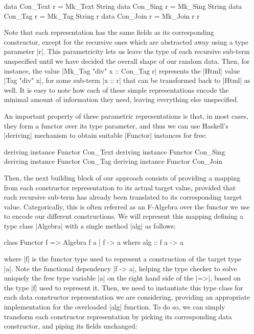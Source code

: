 \begin{code}
data Con_Text   r = Mk_Text  String
data Con_Sing   r = Mk_Sing  String
data Con_Tag    r = Mk_Tag   String r
data Con_Join   r = Mk_Join  r r
\end{code}
%
Note that each representation has the same fields as its corresponding
constructor, except for the recursive ones which are abstracted away using a
type parameter |r|.
%
This parametricity lets us leave the type of each recursive sub-term unspecified
until we have decided the overall shape of our random data.
%
Then, for instance, the value |Mk_Tag "div" x :: Con_Tag r| represents the
|Html| value |Tag "div" x|, for some sub-term |x :: r| that can be transformed
back to |Html| as well.
%
It is easy to note how each of these simple representations encode the minimal
amount of information they need, leaving everything else unspecified.

An important property of these parametric representations is that, in most
cases, they form a functor over its type parameter, and thus we can use
Haskell's |deriving| mechanism to obtain suitable |Functor| instances for free:

\begin{code}
deriving instance Functor Con_Text
deriving instance Functor Con_Sing
deriving instance Functor Con_Tag
deriving instance Functor Con_Join
\end{code}


%
Then, the next building block of our approach consists of providing a mapping
from each constructor representation to its actual target value, provided that
each recursive sub-term has already been translated to its corresponding target
value.
%
Categorically, this is often referred as an F-Algebra over the functor we use to
encode our different constructions.
%
We will represent this mapping defining a type class |Algebra| with a single
method |alg| as follows:

\begin{code}
class Functor f => Algebra f a | f -> a where
  alg :: f a -> a
\end{code}
%
where |f| is the functor type used to represent a construction of the target
type |a|.
%
Note the functional dependency |f -> a|, helping the type checker to solve
uniquely the free type variable |a| on the right hand side of the |=>|, based on
the type |f| used to represent it.
%
%
Then, we need to instantiate this type class for each data constructor
representation we are considering, providing an appropriate implementation for
the overloaded |alg| function.
%
To do so, we can simply transform each constructor representation by picking its
corresponding data constructor, and piping its fields unchanged:

